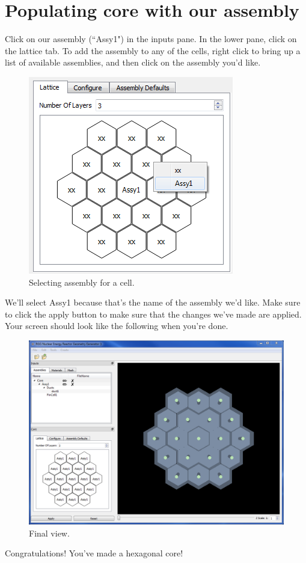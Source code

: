 \section{Populating core with our assembly}

Click on our assembly (``Assy1") in the inputs pane.  In the lower pane, click on the lattice tab.  To add the assembly to any of the cells, right click to bring up a list of available assemblies, and then click on the assembly you'd like.

\begin{figure}[H]
	\begin{center}
		\includegraphics[width=0.5\linewidth]{Images/hex-19.png}
		\caption{Selecting assembly for a cell.}
		\label{fig:Hex19}
	\end{center}
\end{figure}

We'll select Assy1 because that's the name of the assembly we'd like.  Make sure to click the apply button to make sure that the changes we've made are applied.  Your screen should look like the following when you're done.

\begin{figure}[H]
	\begin{center}
		\includegraphics[width=0.85\linewidth]{Images/hex-20.png}
		\caption{Final view.}
		\label{fig:Hex20}
	\end{center}
\end{figure}

Congratulations!  You've made a hexagonal core!